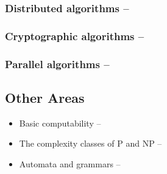 \documentclass[12pt]{article}
\begin{document}
		\subsubsection{Distributed algorithms – }
		
		\subsubsection{Cryptographic algorithms – }
		
		\subsubsection{Parallel algorithms – }
		
	\subsection{Other Areas}
		\begin{itemize}[label=$\bullet$,leftmargin=39pt]
			\item Basic computability – 
			\item The complexity classes of P and NP  – 
			\item Automata and grammars – 
		\end{itemize}
\end{document}

